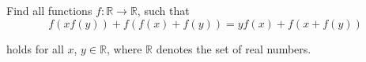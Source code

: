 Find all functions $ f: \mathbb{R} \to \mathbb{R}$,  such that\[ f(xf(y)) + f(f(x) + f(y)) = yf(x) + f(x + f(y))\]

holds for all $ x$,  $ y \in \mathbb{R}$,  where $ \mathbb{R}$ denotes the set of real numbers.